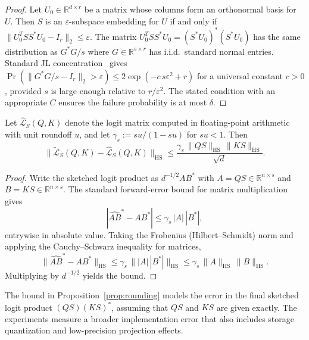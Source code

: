 \begin{proof}
    Let $U_0 \in \mathbb{R}^{d \times r}$ be a matrix whose columns form an orthonormal basis for $U$. Then $S$ is an $\varepsilon$-subspace embedding for $U$ if and only if $\|U_0^T SS^* U_0 - I_r\|_2 \leq \varepsilon$. The matrix $U_0^T SS^* U_0 = (S^* U_0)^*(S^* U_0)$ has the same distribution as $G^*G/s$ where $G \in \mathbb{R}^{s \times r}$ has i.i.d.\ standard normal entries. Standard JL concentration~\autocite{HalkoMartinssonTropp2011} gives $\Pr(\|G^*G/s - I_r\|_2 > \varepsilon) \leq 2\exp(-c\,s\varepsilon^2 + r)$ for a universal constant $c > 0$, provided $s$ is large enough relative to $r/\varepsilon^2$. The stated condition with an appropriate $C$ ensures the failure probability is at most $\delta$.
\end{proof}

\begin{proposition}
    \label{prop:rounding}
    Let $\widehat{\mathcal{L}}_S(Q,K)$ denote the logit matrix computed in floating-point arithmetic with unit roundoff $u$, and let $\gamma_s := su/(1-su)$ for $su < 1$. Then
    \[
        \|\widetilde{\mathcal{L}}_S(Q,K) - \widehat{\mathcal{L}}_S(Q,K)\|_{\mathrm{HS}}
        \leq
        \frac{\gamma_s\,\|QS\|_{\mathrm{HS}}\,\|KS\|_{\mathrm{HS}}}{\sqrt{d}}.
    \]
\end{proposition}

\begin{proof}
    Write the sketched logit product as $d^{-1/2} A B^*$ with $A = QS \in \mathbb{R}^{n \times s}$ and $B = KS \in \mathbb{R}^{n \times s}$. The standard forward-error bound for matrix multiplication~\autocite{Higham2002} gives
    \[
        |\widehat{AB}^* - AB^*| \leq \gamma_s\, |A|\,|B^*|,
    \]
    entrywise in absolute value. Taking the Frobenius (Hilbert--Schmidt) norm and applying the Cauchy--Schwarz inequality for matrices,
    \[
        \|\widehat{AB}^* - AB^*\|_{\mathrm{HS}}
        \leq \gamma_s\, \||A|\,|B^*|\|_{\mathrm{HS}}
        \leq \gamma_s\, \|A\|_{\mathrm{HS}}\,\|B\|_{\mathrm{HS}}.
    \]
    Multiplying by $d^{-1/2}$ yields the bound.
\end{proof}

\begin{remark}
    The bound in Proposition~\ref{prop:rounding} models the error in the final sketched logit product $(QS)(KS)^*$, assuming that $QS$ and $KS$ are given exactly. The experiments measure a broader implementation error that also includes storage quantization and low-precision projection effects.
\end{remark}

